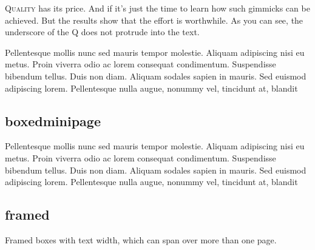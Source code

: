 \begin{filecontents*}{\democodefile}
\lettrine[lines=4, loversize=-.1, lraise=.1]{Q}{uality} has its price. And if
it's just the time to learn how such gimmicks can be achieved. But the
results show that the effort is worthwhile. As you can see, the underscore
of the Q does not protrude into the text.
\end{filecontents*}

%

\begin{filecontents*}{\democodefile}
\begin{boxedminipage}{0.5\textwidth}
Pellentesque mollis nunc sed mauris tempor molestie. Aliquam adipiscing nisi eu metus. Proin viverra odio ac lorem consequat condimentum. Suspendisse bibendum tellus. Duis non diam. Aliquam sodales sapien in mauris. Sed euismod adipiscing lorem. Pellentesque nulla augue, nonummy vel, tincidunt at, blandit 
\end{boxedminipage}
\end{filecontents*}

\subsection{boxedminipage}

%


\begin{filecontents*}{\democodefile}
\begin{framed}
Pellentesque mollis nunc sed mauris tempor molestie.
Aliquam adipiscing nisi eu metus. Proin viverra odio ac
lorem consequat condimentum. Suspendisse bibendum tellus.
Duis non diam. Aliquam sodales sapien in mauris. Sed
euismod adipiscing lorem. Pellentesque nulla augue, 
nonummy vel, tincidunt at, blandit 
\end{framed}
\end{filecontents*}

\subsection{framed}

Framed boxes with text width, which can span over more than one page.

